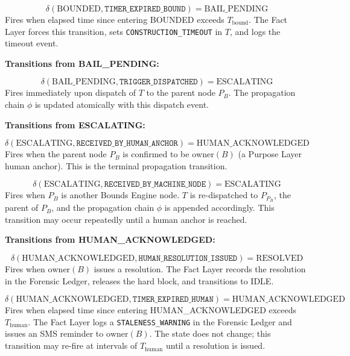 \begin{equation}
\delta(\text{BOUNDED}, \texttt{TIMER\_EXPIRED\_BOUND}) = \text{BAIL\_PENDING}
\end{equation}
Fires when elapsed time since entering BOUNDED exceeds $T_{\text{bound}}$. The Fact Layer forces this transition, sets \texttt{CONSTRUCTION\_TIMEOUT} in $T$, and logs the timeout event.

\bigskip

\textbf{Transitions from BAIL\_PENDING:}

\begin{equation}
\delta(\text{BAIL\_PENDING}, \texttt{TRIGGER\_DISPATCHED}) = \text{ESCALATING}
\end{equation}
Fires immediately upon dispatch of $T$ to the parent node $P_B$. The propagation chain $\phi$ is updated atomically with this dispatch event.

\bigskip

\textbf{Transitions from ESCALATING:}

\begin{equation}
\delta(\text{ESCALATING}, \texttt{RECEIVED\_BY\_HUMAN\_ANCHOR}) = \text{HUMAN\_ACKNOWLEDGED}
\end{equation}
Fires when the parent node $P_B$ is confirmed to be $\text{owner}(B)$ (a Purpose Layer human anchor). This is the terminal propagation transition.

\begin{equation}
\delta(\text{ESCALATING}, \texttt{RECEIVED\_BY\_MACHINE\_NODE}) = \text{ESCALATING}
\end{equation}
Fires when $P_B$ is another Bounds Engine node. $T$ is re-dispatched to $P_{P_B}$, the parent of $P_B$, and the propagation chain $\phi$ is appended accordingly. This transition may occur repeatedly until a human anchor is reached.

\bigskip

\textbf{Transitions from HUMAN\_ACKNOWLEDGED:}

\begin{equation}
\delta(\text{HUMAN\_ACKNOWLEDGED}, \texttt{HUMAN\_RESOLUTION\_ISSUED}) = \text{RESOLVED}
\end{equation}
Fires when $\text{owner}(B)$ issues a resolution. The Fact Layer records the resolution in the Forensic Ledger, releases the hard block, and transitions to IDLE.

\begin{equation}
\delta(\text{HUMAN\_ACKNOWLEDGED}, \texttt{TIMER\_EXPIRED\_HUMAN}) = \text{HUMAN\_ACKNOWLEDGED}
\end{equation}
Fires when elapsed time since entering HUMAN\_ACKNOWLEDGED exceeds $T_{\text{human}}$. The Fact Layer logs a \texttt{STALENESS\_WARNING} in the Forensic Ledger and issues an SMS reminder to $\text{owner}(B)$. The state does not change; this transition may re-fire at intervals of $T_{\text{human}}$ until a resolution is issued.

